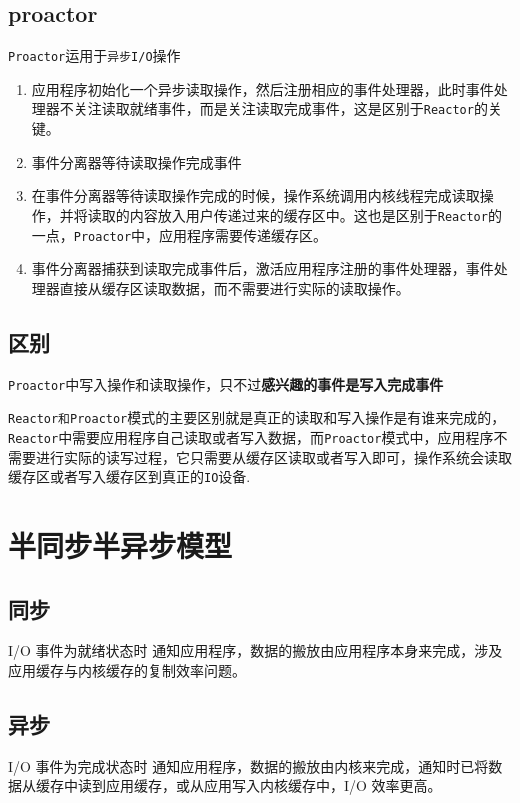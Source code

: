 \documentclass[UTF8,a4paper,12pt]{ctexbook}
\begin{document}
		\subsection{proactor}
			\verb|Proactor|运用于\verb|异步I/O|操作
			
			\begin{enumerate}
				\item 应用程序初始化一个异步读取操作，然后注册相应的事件处理器，此时事件处理器不关注读取就绪事件，而是关注读取完成事件，这是区别于\verb|Reactor|的关键。
				\item 事件分离器等待读取操作完成事件
				\item 在事件分离器等待读取操作完成的时候，操作系统调用内核线程完成读取操作，并将读取的内容放入用户传递过来的缓存区中。这也是区别于\verb|Reactor|的一点，\verb|Proactor|中，应用程序需要传递缓存区。
				\item 事件分离器捕获到读取完成事件后，激活应用程序注册的事件处理器，事件处理器直接从缓存区读取数据，而不需要进行实际的读取操作。
			\end{enumerate}
		
		\subsection{区别}
			\verb|Proactor|中写入操作和读取操作，只不过\textbf{感兴趣的事件是写入完成事件}
		
			\verb|Reactor和Proactor|模式的主要区别就是真正的读取和写入操作是有谁来完成的，\verb|Reactor|中需要应用程序自己读取或者写入数据，而\verb|Proactor|模式中，应用程序不需要进行实际的读写过程，它只需要从缓存区读取或者写入即可，操作系统会读取缓存区或者写入缓存区到真正的\verb|IO|设备.
	
	\newpage
	\section{半同步半异步模型}
		\subsection{同步}
			I/O 事件为就绪状态时 通知应用程序，数据的搬放由应用程序本身来完成，涉及应用缓存与内核缓存的复制效率问题。
			
		\subsection{异步}
			I/O 事件为完成状态时 通知应用程序，数据的搬放由内核来完成，通知时已将数据从缓存中读到应用缓存，或从应用写入内核缓存中，I/O 效率更高。
			
\end{document}

